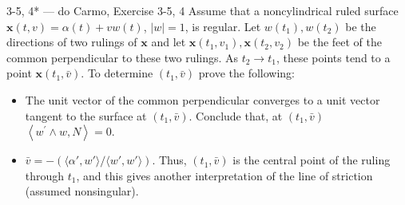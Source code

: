 \begin{exercise}{3-5, 4* — do Carmo, Exercise 3-5, 4}
Assume that a noncylindrical ruled surface $\mathbf{x} (t, v) = \alpha (t) + v w (t)$, $| w | = 1$, is regular. Let $w(t_{1}), w(t_{2})$ be the directions of two rulings of $\mathbf{x}$ and let $\mathbf{x}(t_{1}, v_{1}), \mathbf{x}(t_{2}, v_{2})$ be the feet of the common perpendicular to these two rulings. As $t_{2} \to t_{1}$, these points tend to a point $\mathbf{x}(t_{1}, \bar{v})$. To determine $(t_{1}, \bar{v})$ prove the following:
\begin{itemize}
\item[a.] The unit vector of the common perpendicular converges to a unit vector tangent to the surface at $(t_1,\bar{v})$. Conclude that, at $(t_1,\bar{v})$ $\left\langle w ^ {\prime} \wedge w, N \right\rangle = 0$.
\item[b.] $\bar{v} = -(\langle \alpha', w' \rangle / \langle w', w' \rangle)$. Thus, $(t_1,\bar{v})$ is the central point of the ruling through $t_1$, and this gives another interpretation of the line of striction (assumed nonsingular).
\end{itemize}
\end{exercise}


